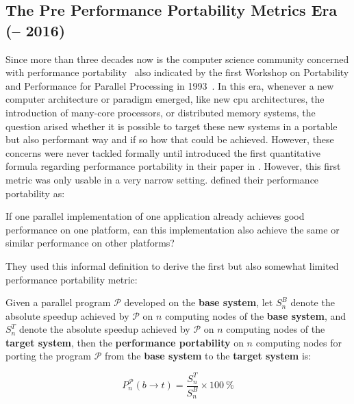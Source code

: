 \subsection{The Pre Performance Portability Metrics Era (-- 2016)}
\label{sec:pre_pp_era}


Since more than three decades now is the computer science community concerned with performance portability~\cite{bailey_nas_1991, irigoin_performance_1994, strazdins_high_1996, foster_performance_1996, reed_portability_1996, ngo_portable_1997, jiang_application_1997, cermele_performance_1998, zaafrani_performance_1999, michalakes_performance-portability_2001, goos_achieving_2001, ko_frame_2002, worley_performance_2005, jones_practical_2005, komatsu_evaluating_2010, gabriel_towards_2010} also indicated by the first Workshop on Portability and Performance for Parallel Processing in 1993~\cite{hey_portability_1994}. 
In this era, whenever a new computer architecture or paradigm emerged, like new \gls{cpu} architectures, the introduction of many-core processors, or distributed memory systems, the question arised whether it is possible to target these new systems in a portable but also performant way and if so how that could be achieved. 
However, these concerns were never tackled formally until \citet{zhu_performance_2007} introduced the first quantitative formula regarding performance portability in their paper in \citeyear{zhu_performance_2007}. 
However, this first metric was only usable in a very narrow setting. 
\citeauthor{zhu_performance_2007} defined their performance portability as:
\begin{quotebox}{\citet{zhu_performance_2007}}
    If one parallel implementation of one application already achieves good performance on one platform, can this implementation also achieve the same or similar performance on other platforms?
\end{quotebox}
They used this informal definition to derive the first but also somewhat limited performance portability metric:

\begin{definition}
Given a parallel program $\mathcal{P}$ developed on the \textbf{base system}, let $S^B_n$ denote the absolute speedup achieved by $\mathcal{P}$ on $n$ computing nodes of the \textbf{base system}, and $S^T_n$ denote the absolute speedup achieved by $\mathcal{P}$ on $n$ computing nodes of the \textbf{target system}, then the \textbf{performance portability} on $n$ computing nodes for porting the program $\mathcal{P}$ from the \textbf{base system} to the \textbf{target system} is:

$$P^\mathcal{P}_n(b \rightarrow t) = \frac{S^T_n}{S^B_n} \times \SI{100}{\percent}$$
\end{definition}

